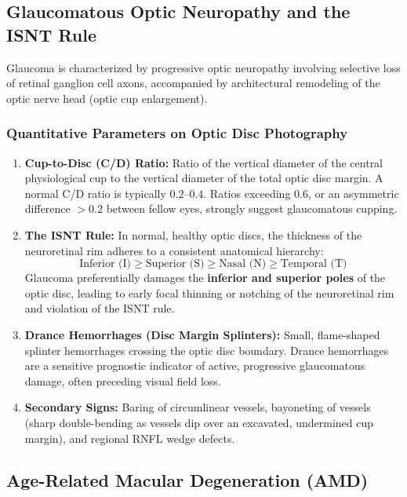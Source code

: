 \documentclass[11pt,a4paper]{article}
\begin{document}
\subsection{Glaucomatous Optic Neuropathy and the ISNT Rule}

Glaucoma is characterized by progressive optic neuropathy involving selective loss of retinal ganglion cell axons, accompanied by architectural remodeling of the optic nerve head (optic cup enlargement).

\subsubsection{Quantitative Parameters on Optic Disc Photography}
\begin{enumerate}[leftmargin=*]
    \item \textbf{Cup-to-Disc (C/D) Ratio:} Ratio of the vertical diameter of the central physiological cup to the vertical diameter of the total optic disc margin. A normal C/D ratio is typically $0.2\text{--}0.4$. Ratios exceeding $0.6$, or an asymmetric difference $> 0.2$ between fellow eyes, strongly suggest glaucomatous cupping.
    \item \textbf{The ISNT Rule:} In normal, healthy optic discs, the thickness of the neuroretinal rim adheres to a consistent anatomical hierarchy:
    \begin{equation}
        \text{Inferior (I)} \ge \text{Superior (S)} \ge \text{Nasal (N)} \ge \text{Temporal (T)}
    \end{equation}
    Glaucoma preferentially damages the \textbf{inferior and superior poles} of the optic disc, leading to early focal thinning or notching of the neuroretinal rim and violation of the ISNT rule.
    \item \textbf{Drance Hemorrhages (Disc Margin Splinters):} Small, flame-shaped splinter hemorrhages crossing the optic disc boundary. Drance hemorrhages are a sensitive prognostic indicator of active, progressive glaucomatous damage, often preceding visual field loss.
    \item \textbf{Secondary Signs:} Baring of circumlinear vessels, bayoneting of vessels (sharp double-bending as vessels dip over an excavated, undermined cup margin), and regional RNFL wedge defects.
\end{enumerate}

\subsection{Age-Related Macular Degeneration (AMD)}
\end{document}
